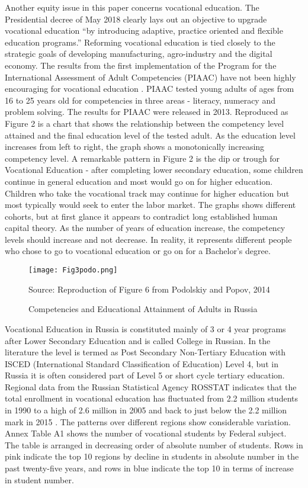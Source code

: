 \documentclass[alpha-refs,fleqn]{wiley-article_p2}
\begin{document}
Another equity issue in this paper concerns vocational education. The Presidential decree of May 2018 clearly lays out an objective to upgrade vocational education ``by introducing adaptive, practice oriented and flexible education programs.'' Reforming vocational education is tied closely to the strategic goals of developing manufacturing, agro-industry and the digital economy. The results from the first implementation of the Program for the International Assessment of Adult Competencies (PIAAC) have not been highly encouraging for vocational education \cite{Podolskiy_2014}. PIAAC tested young adults of ages from 16 to 25 years old for competencies in three areas - literacy, numeracy and problem solving. The results for PIAAC were released in 2013. Reproduced as Figure 2 is a chart that shows the relationship between the competency level attained and the final education level of the tested adult. As the education level increases from left to right, the graph shows a monotonically increasing competency level. A remarkable pattern in Figure 2 is the dip or trough for Vocational Education - after completing lower secondary education, some children continue in general education and most would go on for higher education. Children who take the vocational track may continue for higher education but most typically would seek to enter the labor market. The graphs shows different cohorts, but at first glance it appears to contradict long established human capital theory. As the number of years of education increase, the competency levels should increase and not decrease. In reality, it represents different people who chose to go to vocational education or go on for a Bachelor's degree.  
 
\begin{figure}[htbp!]
\begin{centering}
\texttt{[image: Fig3podo.png]}
\end{centering}
\footnotesize{Source: Reproduction of Figure 6 from Podolskiy and Popov, 2014}
\caption{Competencies and Educational Attainment of Adults in Russia}
\end{figure}

Vocational Education in Russia is constituted mainly of 3 or 4 year programs after Lower Secondary Education and is called College in Russian. In the literature the level is termed as Post Secondary Non-Tertiary Education with ISCED (International Standard Classification of Education) Level 4, but in Russia it is often considered part of Level 5 or short cycle tertiary education. Regional data from the Russian Statistical Agency ROSSTAT indicates that the total enrollment in vocational education has fluctuated from 2.2 million students in 1990 to a high of 2.6 million in 2005 and back to just below the 2.2 million mark in 2015 \cite{Mirkina_2014}. The patterns over different regions show considerable variation. Annex Table A1 shows the number of vocational students by Federal subject. The table is arranged in decreasing order of absolute number of students. Rows in pink indicate the top 10 regions by decline in students in absolute number in the past twenty-five years, and rows in blue indicate the top 10 in terms of increase in student number. 
\end{document}
